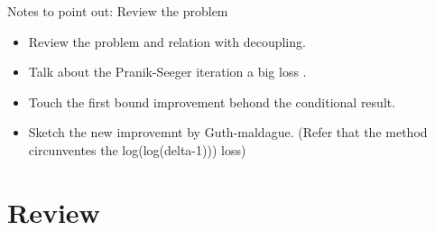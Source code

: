 Notes to point out: Review the problem


\begin{itemize}
    \item Review the problem and relation with decoupling.
    \item Talk about the Pranik-Seeger iteration a big loss .
    \item Touch the first bound improvement behond the conditional result.
    \item Sketch the new improvemnt by Guth-maldague. (Refer that the method circunventes the log(log(delta-1))) loss)
\end{itemize}

\section{Review}
